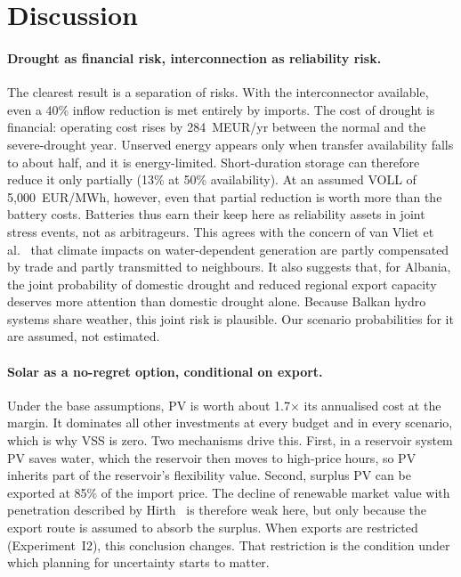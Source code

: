 \section{Discussion}
\label{sec:discussion}

\paragraph{Drought as financial risk, interconnection as reliability risk.} The clearest result is a separation
of risks. With the interconnector available, even a 40\% inflow reduction is met entirely by imports. The cost
of drought is financial: operating cost rises by 284~MEUR/yr between the normal and the severe-drought year.
Unserved energy appears only when transfer availability falls to about half, and it is energy-limited.
Short-duration storage can therefore reduce it only partially (13\% at 50\% availability). At an assumed VOLL of
5{,}000~EUR/MWh, however, even that partial reduction is worth more than the battery costs. Batteries thus
earn their keep here as reliability assets in joint stress events, not as arbitrageurs. This agrees with the concern of van Vliet et
al.~\cite{vanvliet2016vulnerability} that climate impacts on water-dependent generation are partly
compensated by trade and partly transmitted to neighbours. It also suggests that, for Albania, the joint
probability of domestic drought and reduced regional export capacity deserves more attention than domestic
drought alone. Because Balkan hydro systems share weather, this joint risk is plausible. Our scenario
probabilities for it are assumed, not estimated.

\paragraph{Solar as a no-regret option, conditional on export.} Under the base assumptions, PV is worth about
1.7$\times$ its annualised cost at the margin. It dominates all other investments at every budget and in every
scenario, which is why VSS is zero. Two mechanisms drive this. First, in a reservoir system PV saves water,
which the reservoir then moves to high-price hours, so PV inherits part of the reservoir's flexibility value.
Second, surplus PV can be exported at 85\% of the import price. The decline of renewable market value with
penetration described by Hirth~\cite{hirth2013market} is therefore weak here, but only because the export
route is assumed to absorb the surplus. When exports are restricted (Experiment~I2), this conclusion changes.
That restriction is the condition under which planning for uncertainty starts to matter.

